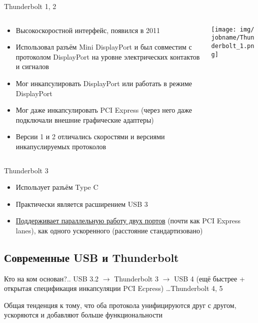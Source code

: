 \documentclass[xetex,aspectratio=43]{beamer}
\begin{document}
\begin{frame}{Thunderbolt 1, 2}
    \begin{columns}
        \begin{column}{0.5\textwidth}
            \begin{itemize}
                \item Высокоскоростной интерфейс, появился в 2011
                \item Использовал разъём Mini DisplayPort и был совместим с протоколом DisplayPort на уровне электрических контактов и сигналов
                \item Мог инкапсулировать DisplayPort или работать в режиме DisplayPort
                \item \alert{Мог даже инкапсулировать PCI Express} (через него даже подключали внешние графические адаптеры)
                \item Версии 1 и 2 отличались скоростями и версиями инкапуслируемых протоколов
            \end{itemize}
        \end{column}
        \begin{column}{0.5\textwidth}
            \texttt{[image: img/\\jobname/Thunderbolt\_1.png]}
        \end{column}
    \end{columns}
\end{frame}

\begin{frame}{Thunderbolt 3}
    \begin{itemize}
        \item Использует разъём Type C
        \item Практически является расширением USB 3
        \item \href{https://market.yandex.ru/product--usb-kontsentrator-baseus-thunderbolt-c-pro-cahub-l0g-razemov-5/424956176}{Поддерживает параллельную работу двух портов} (почти как PCI Express lanes), как одного ускоренного (расстояние стандартизовано)
    \end{itemize}
\end{frame}

\subsection{Современные USB и Thunderbolt}

\begin{frame}{Кто на ком основан?..}
    USB 3.2 $\rightarrow$ Thunderbolt 3 $\rightarrow$ USB 4 (ещё быстрее + открытая спецификация инкапсуляции PCI Ecpress)  \ldots Thunderbolt 4, 5

    Общая тенденция к тому, что оба протокола унифицируются друг с другом, ускоряются и добавляют больше функциональности
\end{frame}
\end{document}
